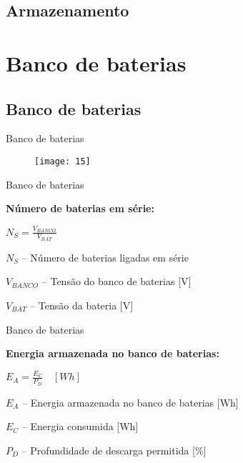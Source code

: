 
\subsection{Armazenamento}

\section{Banco de baterias}
\subsection*{Banco de baterias}
\begin{frame}{Banco de baterias}

\begin{figure}[H]
\texttt{[image: 15]}
\end{figure}

\end{frame}

\begin{frame}{Banco de baterias}

\textbf{Número de baterias em série:}

\vspace{.25cm}
\centering

$N_S = \frac{V_{BANCO}}{V_{BAT}}$

\vspace{.25cm}

\justify
$N_S$ – Número de baterias ligadas em série

$V_{BANCO}$ – Tensão do banco de baterias [V]

$V_{BAT}$ – Tensão da bateria [V]

\end{frame}


\begin{frame}{Banco de baterias}

\textbf{Energia armazenada no banco de baterias:}

\vspace{.25cm}
\centering

$E_A = \frac{E_C}{P_D} \quad [Wh]$
\vspace{.25cm}

\justify
$E_A$ – Energia armazenada no banco de baterias [Wh]

$E_C$ – Energia consumida [Wh]

$P_D$ – Profundidade de descarga permitida [\%]

\end{frame}

